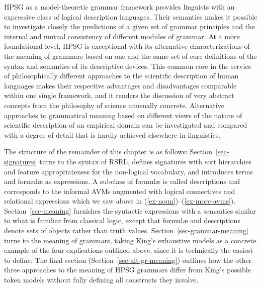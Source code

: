 \documentclass[output=paper,biblatex,babelshorthands,newtxmath,draftmode,colorlinks,citecolor=brown]{langscibook}
\begin{document}
{HPSG as a model-theoretic grammar framework provides linguists with an
expressive class of logical description languages. Their semantics
makes it possible to investigate closely the predictions of a given
set of grammar principles and the internal and mutual consistency
of different modules of grammar. At a more foundational level, HPSG is
exceptional with its alternative characterizations of the meaning of
grammars based on one and the same set of core definitions of the
syntax and semantics of its descriptive devices. This common core in
the service of
philosophically different approaches to the scientific description of
human languages makes their respective advantages and disadvantages
comparable within one single framework, and it renders the discussion
of very abstract concepts from the philosophy of science unusually concrete.  Alternative approaches
to grammatical meaning based on different views of the nature of
scientific description of an empirical domain can be investigated and
compared with a degree of detail that is hardly achieved elsewhere in
linguistics.




The structure of the remainder of this chapter is as follows:
Section~\ref{sec-signatures} turns to the syntax of RSRL, defines
signatures with sort hierarchies and feature appropriateness for the
non-logical vocabulary, and introduces terms and formulæ as
expressions. A subclass of formulæ is called
descriptions and corresponds to the informal
AVMs augmented with logical connectives and relational
expressions which we saw above in (\ref{ex-noun})--(\ref{ex-more-avms}). Section~\ref{sec-meaning} furnishes the syntactic expressions
with a semantics similar to what is familiar from classical logic,
except that formulæ and descriptions denote sets of objects rather than truth
values. Section~\ref{sec-grammar-meaning} turns to the meaning of
grammars, taking King's exhaustive models as a concrete example of the
four explications outlined above, since it is technically the easiest
to define.  The final section (Section~\ref{sec-alt-gr-meaning})
outlines how the other three approaches to the meaning of HPSG grammars
differ from King's possible token models without fully defining all constructs
they involve.

}
\end{document}
